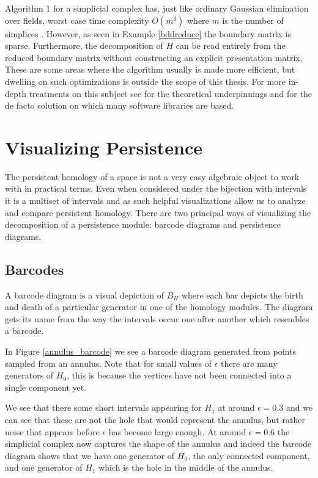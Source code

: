 Algorithm 1 for a simplicial complex has, just like ordinary Gaussian elimination over fields, worst case time complexity $O(m^{3})$ where $m$ is the  number of simplices \cite{Zomorodian2005}. However, as seen in Example \ref{bddreduce} the boundary matrix is sparse. Furthermore, the decomposition of $H$ can be read entirely from the reduced boundary matrix without constructing an explicit presentation matrix. These are some areas where the algorithm usually is made more efficient, but dwelling on such optimizations is outside the scope of this thesis. For more in-depth treatments on this subject see  \cite{edels} for the theoretical underpinnings and \cite{ripser} for the de facto solution on which many software libraries are based.


\section{Visualizing Persistence}
The persistent homology of a space is not a very easy algebraic object to work with in practical terms. Even when considered under the bijection with intervals it is a multiset of intervals and as such helpful visualizations allow us to analyze and compare persistent homology. There are two principal ways of visualizing the decomposition of a persistence module: barcode diagrams and persistence diagrams.

\subsection{Barcodes}
A barcode diagram is a visual depiction of $B_{H}$ where each bar depicts the birth and death of a particular generator in one of the homology modules. The diagram gets its name from the way the intervals occur one after another which resembles a barcode.

In Figure \ref{annulus_barcode} we see a barcode diagram generated from points sampled from an annulus. Note that for small values of $\epsilon$ there are many generators of $H_{0}$, this is because the vertices have not been connected into a single component yet.

  We see that there some short intervals appearing for $H_{1}$ at around $\epsilon=0.3$ and we can see that these are not the hole that would represent the annulus, but rather noise that appears before $\epsilon$ has become large enough. At around $\epsilon=0.6$ the simplicial complex now captures the shape of the annulus and indeed the barcode diagram shows that we have one generator of $H_{0}$, the only connected component, and one generator of $H_{1}$ which is the hole in the middle of the annulus.

